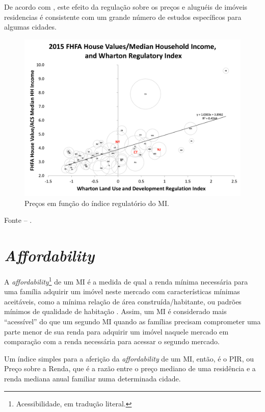 \documentclass[
	12pt,				%
	oneside,			%
	a4paper,			%
	chapter=TITLE,		%
	section=TITLE,		%
	english,			%
	brazil				%
	]{abntex2}
\newcommand{\bcenter}{\begin{center}}
\newcommand{\ecenter}{\end{center}}
\begin{document}
\begin{refsection}
De acordo com \textcite[p.~236-237]{externalities}, este efeito da regulação sobre os
preços e aluguéis de imóveis residencias é consistente com um grande número de
estudos específicos para algumas cidades.
\begin{figure}[H]

{\centering \includegraphics[width=0.7\linewidth]{images/figure_01_Malpezzi_Affordable} 

}

\caption{Preços em função do índice regulatório do \gls{MI}.}\label{fig:regulation-price}
\end{figure}
\bcenter

\small Fonte -- \textcite{malpezzi_affordable_2018_4}.
\ecenter

\hypertarget{affordability}{%
\section{\texorpdfstring{\emph{Affordability}}{Affordability}}\label{affordability}}

A \emph{affordability}\footnote{Acessibilidade, em tradução literal.} de um \gls{MI} é a medida de qual a renda mínima necessária
para uma família adquirir um imóvel neste mercado com características mínimas
aceitáveis, como a mínima relação de área construída/habitante, ou padrões
mínimos de qualidade de habitação \autocite[p.~222]{bertaud}. Assim, um \gls{MI} é
considerado mais ``acessível'' do que um segundo \gls{MI} quando as famílias
precisam comprometer uma parte menor de sua renda para adquirir um imóvel
naquele mercado em comparação com a renda necessária para acessar o segundo
mercado.

Um índice simples para a aferição da \emph{affordability} de um \gls{MI}, então, é o
\gls{PIR}, ou Preço sobre a Renda, que é a razão entre o preço mediano de
uma residência e a renda mediana anual familiar numa determinada cidade.


\end{refsection}
\end{document}

